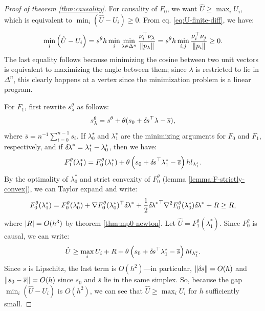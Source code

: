\documentclass[smallcondensed]{svjour3}
\begin{document}
\begin{proof}[Proof of theorem \ref{thm:causality}]
  For causality of $F_0$, we want $\hat{U} \geq \max_i U_i$, which is
  equivalent to $\min_i(\hat{U} - U_i) \geq 0$. From eq.\@
  \ref{eq:U-finite-diff}, we have:
  \begin{equation}
    \min_i \left(\hat{U} - U_i\right) = s^\theta h \min_i \min_{\lambda \in \Delta^n} \frac{\nu_i^\top \nu_{\lambda}}{\left\|p_\lambda\right\|} = s^\theta h \min_{i, j} \frac{\nu_i^\top \nu_j}{\left\|p_i\right\|} \geq 0.
  \end{equation}
  The last equality follows because minimizing the cosine between two
  unit vectors is equivalent to maximizing the angle between them;
  since $\lambda$ is restricted to lie in $\Delta^n$, this clearly
  happens at a vertex since the minimization problem is a linear
  program.

  For $F_1$, first rewrite $s_\lambda^\theta$ as follows:
  \begin{equation}
    s_\lambda^\theta = s^\theta + \theta (s_0 + {\delta \hspace{-0.1em} s}^\top \lambda - \overline{s}),
  \end{equation}
  where $\overline{s} = n^{-1} \sum_{i=0}^{n-1} s_i$. If
  $\lambda_0^\star$ and $\lambda_1^\star$ are the minimizing arguments
  for $F_0$ and $F_1$, respectively, and if
  ${\delta \hspace{-0.1em} \lambda}^* = \lambda_1^* - \lambda_0^*$, then we have:
  \begin{equation}\label{eq:F1-in-terms-of-F0}
    F_1^\theta(\lambda_1^*) = F_0^\theta(\lambda_1^*) + \theta \left(s_0 + {\delta \hspace{-0.1em} s}^\top \lambda_1^* - \overline{s}\right) h l_{\lambda_1^\star}.
  \end{equation}
  By the optimality of $\lambda_0^*$ and strict convexity of
  $F_0^\theta$ (lemma \ref{lemma:F-strictly-convex}), we can Taylor
  expand and write:
  \begin{equation}
    F_0^\theta(\lambda_1^*) = F_0^\theta(\lambda_0^*) + \nabla F_0^\theta(\lambda_0^*)^\top {\delta \hspace{-0.1em} \lambda}^* + \frac{1}{2} {{\delta \hspace{-0.1em} \lambda}^*}^\top \nabla^2 F_0^\theta(\lambda_0^*) {\delta \hspace{-0.1em} \lambda}^* + R \geq R,
  \end{equation}
  where $\left|R\right| = O(h^3)$ by theorem \ref{thm:mp0-newton}. Let
  $\hat{U} = F_1^\theta(\lambda_1^*)$. Since $F_0^\theta$ is causal,
  we can write:
  \begin{equation}
    \hat{U} \geq \max_i U_i + R + \theta \left(s_0 + {\delta \hspace{-0.1em} s}^\top \lambda_1^* - \overline{s}\right) h l_{\lambda_1^*}.
  \end{equation}
  Since $s$ is Lipschitz, the last term is $O(h^2)$---in particular,
  $\left\|{\delta \hspace{-0.1em} s}\right\| = O(h)$ and $\left\|s_0 - \overline{s}\right\| = O(h)$ since
  $s_0$ and $\overline{s}$ lie in the same simplex. So, because the
  gap $\min_i(\hat{U} - U_i)$ is $O(h^2)$, we can see that
  $\hat{U} \geq \max_i U_i$ for $h$ sufficiently small.
\end{proof}


{}
\end{document}
